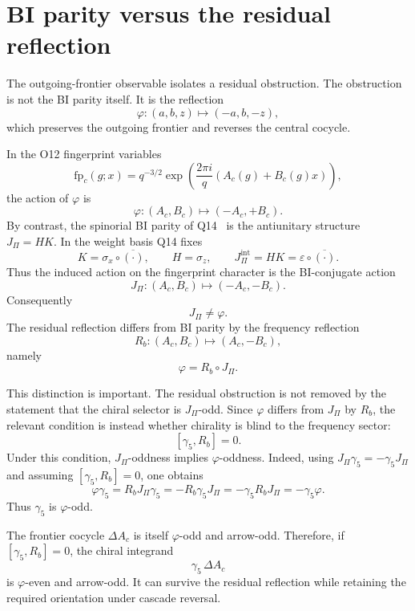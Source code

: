 \documentclass[11pt]{article}
\begin{document}
  \section{BI parity versus the residual reflection}
    \label{sec:bi-residual}

    The outgoing-frontier observable isolates a residual obstruction.
    The obstruction is not the BI parity itself.
    It is the reflection
    \[
      \varphi:(a,b,z)\longmapsto(-a,b,-z),
    \]
    which preserves the outgoing frontier and reverses the central cocycle.

    In the O12 fingerprint variables
    \[
      \mathrm{fp}_c(g;x)
      =
      q^{-3/2}
      \exp\left(\frac{2\pi i}{q}(A_c(g)+B_c(g)x)\right),
    \]
    the action of $\varphi$ is
    \[
      \varphi:(A_c,B_c)\longmapsto(-A_c,+B_c).
    \]
    By contrast, the spinorial BI parity of Q14~\cite{Beau2026q14} is the antiunitary structure
    $J_\Pi=HK$.
    In the weight basis Q14 fixes
    \[
      K=\sigma_x\circ\overline{(\cdot)},\qquad H=\sigma_z,\qquad
      J_\Pi^{\mathrm{int}}=HK=\varepsilon\circ\overline{(\cdot)}.
    \]
    Thus the induced action on the fingerprint character is the BI-conjugate action
    \[
      J_\Pi:(A_c,B_c)\longmapsto(-A_c,-B_c).
    \]
    Consequently
    \[
      J_\Pi\neq\varphi.
    \]
    The residual reflection differs from BI parity by the frequency reflection
    \[
      R_b:(A_c,B_c)\longmapsto(A_c,-B_c),
    \]
    namely
    \[
      \varphi=R_b\circ J_\Pi.
    \]

    This distinction is important.
    The residual obstruction is not removed by the statement that the chiral selector is
    $J_\Pi$-odd.
    Since $\varphi$ differs from $J_\Pi$ by $R_b$, the relevant condition is instead
    whether chirality is blind to the frequency sector:
    \[
      [\gamma_5,R_b]=0.
    \]
    Under this condition, $J_\Pi$-oddness implies $\varphi$-oddness.
    Indeed, using $J_\Pi\gamma_5=-\gamma_5J_\Pi$ and assuming
    $[\gamma_5,R_b]=0$, one obtains
    \[
      \varphi\gamma_5
      =
      R_bJ_\Pi\gamma_5
      =
      -R_b\gamma_5J_\Pi
      =
      -\gamma_5R_bJ_\Pi
      =
      -\gamma_5\varphi.
    \]
    Thus $\gamma_5$ is $\varphi$-odd.

    The frontier cocycle $\Delta A_c$ is itself $\varphi$-odd and arrow-odd.
    Therefore, if $[\gamma_5,R_b]=0$, the chiral integrand
    \[
      \gamma_5\,\Delta A_c
    \]
    is $\varphi$-even and arrow-odd.
    It can survive the residual reflection while retaining the required orientation under
    cascade reversal.
\end{document}
